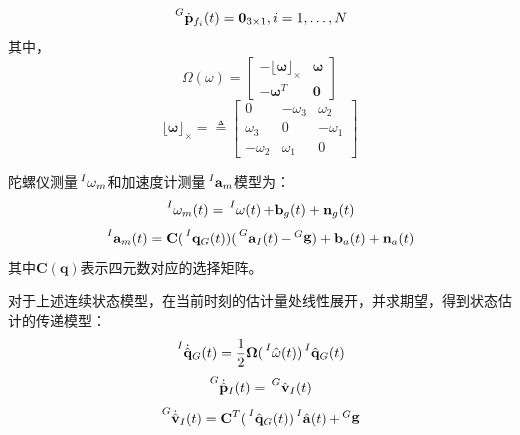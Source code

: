 \documentclass{article}
\begin{document}
\begin{equation}
    \sideset{^G}{}{\mathop{\dot{\mathbf{p}}_{f_i}(t)}}=\textbf{0}_{3\times 1},i=1,\dots,N
\end{equation}
其中，
\begin{equation}
    \Omega(\omega)=\left[\begin{array}{cc}
        -\lfloor{\mathbf{\omega}}\rfloor_{\times} &\mathbf{\omega}\\
        -\mathbf{\omega}^T &\textbf{0}
    \end{array}\right]
\end{equation}
\begin{equation}
    \lfloor{\mathbf{\omega}}\rfloor_{\times}=\triangleq 
    \left[\begin{array}{ccc}
        0 &-\omega_3 &\omega_2\\
        \omega_3 &0 &-\omega_1\\
        -\omega_2 &\omega_1 &0
    \end{array}\right]
\end{equation}
\par
陀螺仪测量$\sideset{^I}{}{\mathop{\mathbf{\omega}_m}}$和加速度计测量$\sideset{^I}{}{\mathop{\mathbf{a}_m}}$模型为：
\begin{equation}
    \sideset{^I}{}{\mathop{\mathbf{\omega}_{m}(t)}}=\sideset{^I}{}{\mathop{\mathbf{\omega}(t)}}
    +\textbf{b}_{g}(t)+\textbf{n}_{g}(t)
\end{equation}
\begin{equation}
    \sideset{^I}{}{\mathop{\mathbf{a}_{m}(t)}}=\textbf{C}(\sideset{^I}{}{\mathop{\mathbf{q}_{G}(t)}})
    (\sideset{^G}{}{\mathop{\mathbf{a}_{I}(t)}}-\sideset{^G}{}{\mathop{\mathbf{g}}})
    +\textbf{b}_{a}(t)+\textbf{n}_{a}(t)
\end{equation}
其中$\textbf{C}(\mathbf{q})$表示四元数对应的选择矩阵。
\par
对于上述连续状态模型，在当前时刻的估计量处线性展开，并求期望，得到状态估计的传递模型：
\begin{equation}\label{eqs:sysmodel21}
    \sideset{^I}{}{\mathop{\dot{\hat{\mathbf{q}}}_{G}(t)}}=\frac{1}{2}\mathbf{\Omega}(\sideset{^I}{}{\mathop{\hat{\omega}(t)}})\sideset{^I}{}{\mathop{\hat{\mathbf{q}}_{G}(t)}}
\end{equation}
\begin{equation}\label{eqs:sysmodel22}
    \sideset{^G}{}{\mathop{\dot{\hat{\mathbf{p}}}_{I}(t)}}=\sideset{^G}{}{\mathop{\hat{\mathbf{v}}_{I}(t)}}
\end{equation}
\begin{equation}\label{eqs:sysmodel23}
    \sideset{^G}{}{\mathop{\dot{\hat{\mathbf{v}}}_{I}(t)}}=\textbf{C}^{T}(\sideset{^I}{}{\mathop{\hat{\mathbf{q}}_{G}(t)}})
    \sideset{^I}{}{\mathop{\hat{\mathbf{a}}(t)}}+\sideset{^G}{}{\mathop{\mathbf{g}}}
\end{equation}
\end{document}
